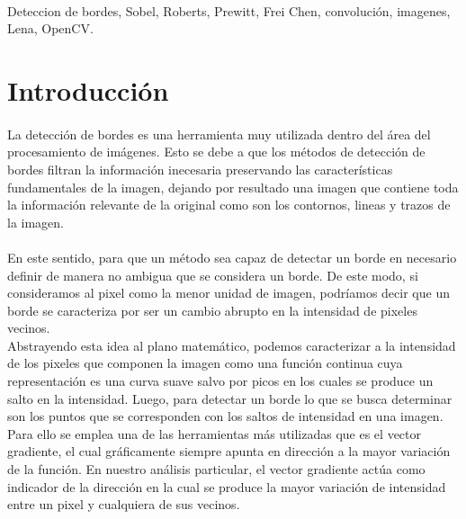 \documentclass[11pt, a4paper]{article}
\begin{document}
\vspace{5 pt}

{\small\textbf{}\\
Deteccion de bordes, Sobel, Roberts, Prewitt, Frei Chen, convoluci\'on, imagenes, Lena, OpenCV.
}


\newpage


\section{Introducci\'on}

\paragraph{}
La detecci\'on de bordes es una herramienta muy utilizada dentro del \'area del procesamiento de im\'agenes. Esto se debe a que los m\'etodos de detecci\'on de bordes filtran la informaci\'on inecesaria preservando las caracter\'isticas fundamentales de la imagen, dejando por resultado una imagen que contiene toda la informaci\'on relevante de la original como son los contornos, lineas y trazos de la imagen.

\paragraph{}
En este sentido, para que un m\'etodo sea capaz de detectar un borde en necesario definir de manera no ambigua que se considera un borde. De este modo, si consideramos al pixel como la menor unidad de imagen, podr\'iamos decir que un borde se caracteriza por ser un cambio abrupto en la intensidad de pixeles vecinos.\\
Abstrayendo esta idea al plano matem\'atico, podemos caracterizar a la intensidad de los pixeles que componen la imagen como una funci\'on continua cuya representaci\'on es una curva suave salvo por picos en los cuales se produce un salto en la intensidad. Luego, para detectar un borde lo que se busca determinar son los puntos que se corresponden con los saltos de intensidad en una imagen.\\
Para ello se emplea una de las herramientas m\'as utilizadas que es el vector gradiente, el cual gr\'aficamente siempre apunta en direcci\'on a la mayor variaci\'on de la funci\'on. En nuestro an\'alisis particular, el vector gradiente act\'ua como indicador de la direcci\'on en la cual se produce la mayor variaci\'on de intensidad entre un pixel y cualquiera de sus vecinos.
\end{document}

